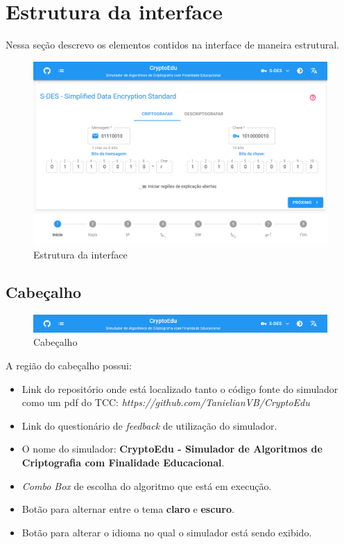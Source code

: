 \section{Estrutura da interface}
Nessa seção descrevo os elementos contidos na interface de maneira estrutural.

\begin{figure}[H]
    \centering
    \caption{Estrutura da interface}
    \includegraphics[width=1\linewidth]{UI/UIEstrutura.png}
\end{figure}

\subsection{Cabeçalho}

\begin{figure}[H]
    \centering
    \caption{Cabeçalho}
    \includegraphics[width=1\linewidth]{UI/UIHeader.png}
\end{figure}

A região do cabeçalho possui:
\begin{itemize}
    \item Link do repositório onde está localizado tanto o código fonte do simulador como um pdf do TCC: \textit{https://github.com/TanielianVB/CryptoEdu}
    \item Link do questionário de \textit{feedback} de utilização do simulador.
    \item O nome do simulador: \textbf{CryptoEdu - Simulador de Algoritmos de Criptografia com Finalidade Educacional}.
    \item \textit{Combo Box} de escolha do algoritmo que está em execução.
    \item Botão para alternar entre o tema \textbf{claro} e \textbf{escuro}.
    \item Botão para alterar o idioma no qual o simulador está sendo exibido.
\end{itemize}

